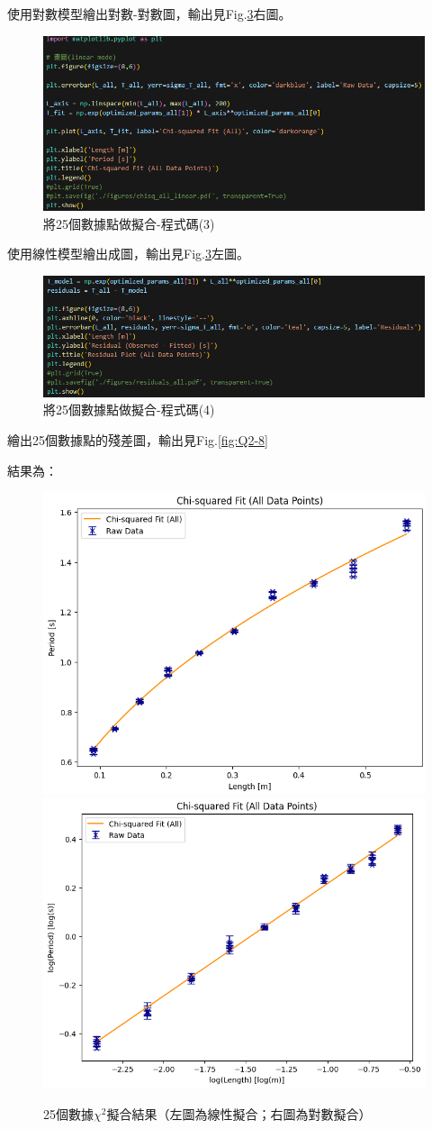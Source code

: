 \documentclass[12pt,a4paper]{article}
\begin{document}
\begin{CJK}{UTF8}{bkai}
使用對數模型繪出對數-對數圖，輸出見Fig.\ref{fig:chi-all}右圖。

\clearpage

\begin{figure}[h]
    \centering
    \includegraphics[width=1\linewidth]{Q2-3.png}
    \caption{將25個數據點做擬合-程式碼(3)}
    \label{fig:Q2-3}
\end{figure}

使用線性模型繪出成圖，輸出見Fig.\ref{fig:chi-all}左圖。

\begin{figure}[h]
    \centering
    \includegraphics[width=1\linewidth]{Q2-6.png}
    \caption{將25個數據點做擬合-程式碼(4)}
    \label{fig:Q2-6}
\end{figure}


繪出25個數據點的殘差圖，輸出見Fig.\ref{fig:Q2-8}

\clearpage

結果為：
\begin{figure}[h]
    \centering
    \includegraphics[width=0.45\linewidth]{Q2-op.png}
    \includegraphics[width=0.45\linewidth]{Q2-op-log.png}
    \caption{25個數據$\chi^2$擬合結果（左圖為線性擬合；右圖為對數擬合）}
    \label{fig:chi-all}
\end{figure}


\end{CJK}
\end{document}
